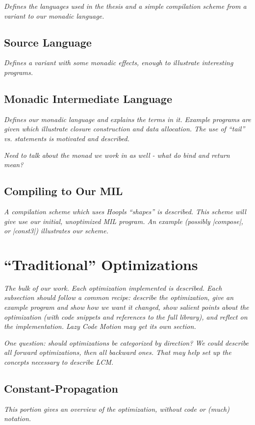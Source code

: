 \documentclass[12pt]{report}
\begin{document}
\emph{Defines the languages used in the thesis and a simple
  compilation scheme from a \lamA variant to our monadic language. }

\section{Source Language}

\emph{Defines a \lamA variant with some monadic effects, enough to
  illustrate interesting programs.}

\section{Monadic Intermediate Language}

\emph{Defines our monadic language and explains the terms in
  it. Example programs are given which illustrate closure construction
  and data allocation. The use of ``tail'' vs. statements is motivated
  and described. }

\emph{Need to talk about the monad we work in as well - what 
do bind and return mean?}

\section{Compiling to Our MIL}
\emph{A compilation scheme which uses Hoopls ``shapes'' is
described. This scheme will give use our initial, unoptimized
MIL program. An example (possibly |compose|, or |const3|) illustrates 
our scheme.}

\chapter{``Traditional'' Optimizations}

\emph{The bulk of our work. Each optimization implemented is
  described. Each subsection should follow a common recipe: describe
  the optimization, give an example program and show how we want it
  changed, show salient points about the optimization (with code
  snippets and references to the full library), and reflect on the
  implementation.  Lazy Code Motion may get its own section.}

\emph{One question: should optimizations be categorized by direction? We could
describe all forward optimizations, then all backward ones. That may help
set up the concepts necessary to describe LCM.}

\section{Constant-Propagation}
\emph{This portion gives an overview of the optimization, without
code or (much) notation.}
\end{document}
